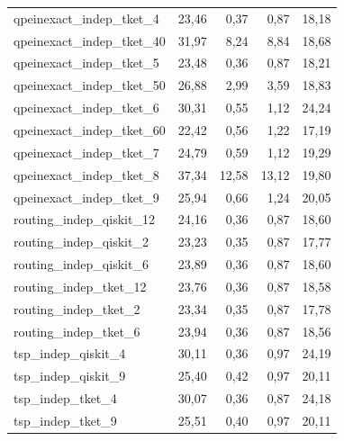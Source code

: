 \begin{longtable}{lrrrr}
qpeinexact\_indep\_tket\_4 & 23,46 & 0,37 & 0,87 & 18,18 \\
qpeinexact\_indep\_tket\_40 & 31,97 & 8,24 & 8,84 & 18,68 \\
qpeinexact\_indep\_tket\_5 & 23,48 & 0,36 & 0,87 & 18,21 \\
qpeinexact\_indep\_tket\_50 & 26,88 & 2,99 & 3,59 & 18,83 \\
qpeinexact\_indep\_tket\_6 & 30,31 & 0,55 & 1,12 & 24,24 \\
qpeinexact\_indep\_tket\_60 & 22,42 & 0,56 & 1,22 & 17,19 \\
qpeinexact\_indep\_tket\_7 & 24,79 & 0,59 & 1,12 & 19,29 \\
qpeinexact\_indep\_tket\_8 & 37,34 & 12,58 & 13,12 & 19,80 \\
qpeinexact\_indep\_tket\_9 & 25,94 & 0,66 & 1,24 & 20,05 \\
routing\_indep\_qiskit\_12 & 24,16 & 0,36 & 0,87 & 18,60 \\
routing\_indep\_qiskit\_2 & 23,23 & 0,35 & 0,87 & 17,77 \\
routing\_indep\_qiskit\_6 & 23,89 & 0,36 & 0,87 & 18,60 \\
routing\_indep\_tket\_12 & 23,76 & 0,36 & 0,87 & 18,58 \\
routing\_indep\_tket\_2 & 23,34 & 0,35 & 0,87 & 17,78 \\
routing\_indep\_tket\_6 & 23,94 & 0,36 & 0,87 & 18,56 \\
tsp\_indep\_qiskit\_4 & 30,11 & 0,36 & 0,97 & 24,19 \\
tsp\_indep\_qiskit\_9 & 25,40 & 0,42 & 0,97 & 20,11 \\
tsp\_indep\_tket\_4 & 30,07 & 0,36 & 0,87 & 24,18 \\
tsp\_indep\_tket\_9 & 25,51 & 0,40 & 0,97 & 20,11 \\
\end{longtable}
\endgroup
